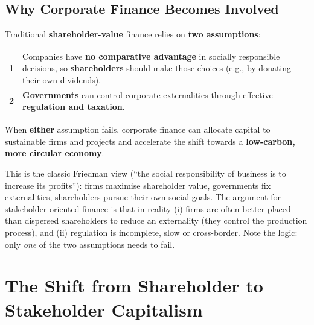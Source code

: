 \subsection{Why Corporate Finance Becomes Involved}
Traditional \textbf{shareholder-value} finance relies on \textbf{two assumptions}:
\begin{center}
\small
\begin{tabular}{@{}cp{12.5cm}@{}}
\toprule
\textbf{1} & Companies have \textbf{no comparative advantage} in socially responsible decisions, so \textbf{shareholders} should make those choices (e.g., by donating their own dividends).\\
\textbf{2} & \textbf{Governments} can control corporate externalities through effective \textbf{regulation and taxation}.\\
\bottomrule
\end{tabular}
\end{center}
\begin{keybox}
When \textbf{either} assumption fails, corporate finance can allocate capital to sustainable firms and projects and accelerate the shift towards a \textbf{low-carbon, more circular economy}.
\end{keybox}
\begin{addbox}
This is the classic Friedman view (``the social responsibility of business is to increase its profits''): firms maximise shareholder value, governments fix externalities, shareholders pursue their own social goals. The argument for stakeholder-oriented finance is that in reality (i) firms are often better placed than dispersed shareholders to reduce an externality (they control the production process), and (ii) regulation is incomplete, slow or cross-border. Note the logic: only \emph{one} of the two assumptions needs to fail.
\end{addbox}

\section{The Shift from Shareholder to Stakeholder Capitalism}

